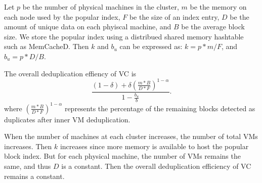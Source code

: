

Let $p$ be the number of physical machines in the cluster, $m$ be the memory on each node used by the popular
index, $F$ be the size of an index entry,
$D$ be the amount of unique data on each phyiscal machine, and 
$B$ be the average block size. We store the popular index using a distribued shared memory hashtable
such as MemCacheD.  Then $k$ and $b_u$ can be expressed as:
$
k = p*m/F$, and $b_u = p*D/B.
$

The overall deduplication effiency of VC is
\[
\frac{ (1-\delta) + \delta (\frac{m*B}{D*F})^{1-\alpha}}
{ 1- \frac{b_u}{b} }.
\]
where $(\frac{m*B}{D*F})^{1-\alpha}$ represents the percentage of the remaining blocks detected as duplicates
after inner VM deduplication. 

When the number of machines at each cluster increases, the number of total VMs increases.
Then $k$ increases since more memory is available to host the popular block index.
But for each physical machine, the number of VMs remains the same, and thus
$D$ is  a constant. Then  the overall deduplication efficiency of VC remains
a constant.







